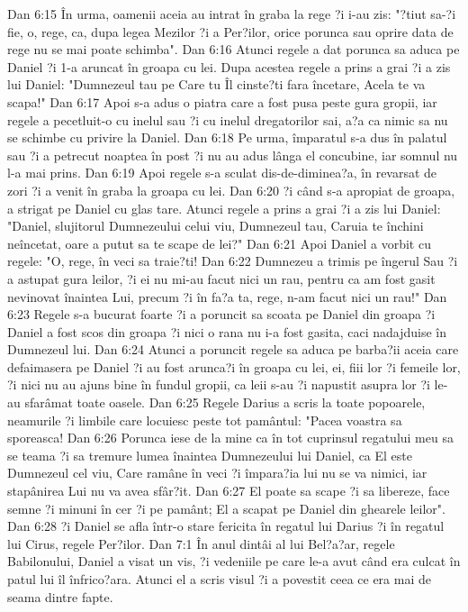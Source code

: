 Dan 6:15  În urma, oamenii aceia au intrat în graba la rege ?i i-au zis: "?tiut sa-?i fie, o, rege, ca, dupa legea Mezilor ?i a Per?ilor, orice porunca sau oprire data de rege nu se mai poate schimba".
Dan 6:16  Atunci regele a dat porunca sa aduca pe Daniel ?i 1-a aruncat în groapa cu lei. Dupa acestea regele a prins a grai ?i a zis lui Daniel: "Dumnezeul tau pe Care tu Îl cinste?ti fara încetare, Acela te va scapa!"
Dan 6:17  Apoi s-a adus o piatra care a fost pusa peste gura gropii, iar regele a pecetluit-o cu inelul sau ?i cu inelul dregatorilor sai, a?a ca nimic sa nu se schimbe cu privire la Daniel.
Dan 6:18  Pe urma, împaratul s-a dus în palatul sau ?i a petrecut noaptea în post ?i nu au adus lânga el concubine, iar somnul nu l-a mai prins.
Dan 6:19  Apoi regele s-a sculat dis-de-diminea?a, în revarsat de zori ?i a venit în graba la groapa cu lei.
Dan 6:20  ?i când s-a apropiat de groapa, a strigat pe Daniel cu glas tare. Atunci regele a prins a grai ?i a zis lui Daniel: "Daniel, slujitorul Dumnezeului celui viu, Dumnezeul tau, Caruia te închini neîncetat, oare a putut sa te scape de lei?"
Dan 6:21  Apoi Daniel a vorbit cu regele: "O, rege, în veci sa traie?ti!
Dan 6:22  Dumnezeu a trimis pe îngerul Sau ?i a astupat gura leilor, ?i ei nu mi-au facut nici un rau, pentru ca am fost gasit nevinovat înaintea Lui, precum ?i în fa?a ta, rege, n-am facut nici un rau!"
Dan 6:23  Regele s-a bucurat foarte ?i a poruncit sa scoata pe Daniel din groapa ?i Daniel a fost scos din groapa ?i nici o rana nu i-a fost gasita, caci nadajduise în Dumnezeul lui.
Dan 6:24  Atunci a poruncit regele sa aduca pe barba?ii aceia care defaimasera pe Daniel ?i au fost arunca?i în groapa cu lei, ei, fiii lor ?i femeile lor, ?i nici nu au ajuns bine în fundul gropii, ca leii s-au ?i napustit asupra lor ?i le-au sfarâmat toate oasele.
Dan 6:25  Regele Darius a scris la toate popoarele, neamurile ?i limbile care locuiesc peste tot pamântul: "Pacea voastra sa sporeasca!
Dan 6:26  Porunca iese de la mine ca în tot cuprinsul regatului meu sa se teama ?i sa tremure lumea înaintea Dumnezeului lui Daniel, ca El este Dumnezeul cel viu, Care ramâne în veci ?i împara?ia lui nu se va nimici, iar stapânirea Lui nu va avea sfâr?it.
Dan 6:27  El poate sa scape ?i sa libereze, face semne ?i minuni în cer ?i pe pamânt; El a scapat pe Daniel din ghearele leilor".
Dan 6:28  ?i Daniel se afla într-o stare fericita în regatul lui Darius ?i în regatul lui Cirus, regele Per?ilor.
Dan 7:1  În anul dintâi al lui Bel?a?ar, regele Babilonului, Daniel a visat un vis, ?i vedeniile pe care le-a avut când era culcat în patul lui îl înfrico?ara. Atunci el a scris visul ?i a povestit ceea ce era mai de seama dintre fapte.
